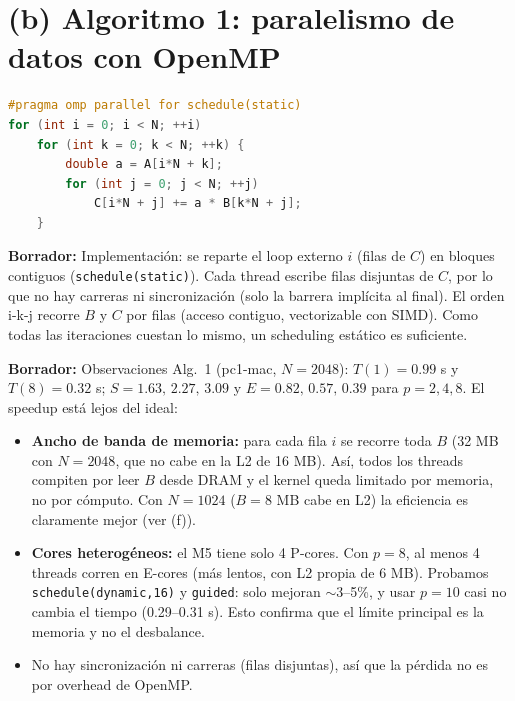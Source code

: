 \documentclass[11pt,a4paper]{article}
\newcommand{\pcA}{pc1-mac}
\newcommand{\nota}[1]{\par\noindent\colorbox{yellow!25}{\parbox{\dimexpr\linewidth-2\fboxsep}{\small\textbf{Borrador:} #1}}\par}
\begin{document}
\section{(b) Algoritmo 1: paralelismo de datos con OpenMP}
\begin{lstlisting}[language=C++]
#pragma omp parallel for schedule(static)
for (int i = 0; i < N; ++i)
    for (int k = 0; k < N; ++k) {
        double a = A[i*N + k];
        for (int j = 0; j < N; ++j)
            C[i*N + j] += a * B[k*N + j];
    }
\end{lstlisting}
\nota{Implementación: se reparte el loop externo $i$ (filas de $C$) en bloques contiguos (\texttt{schedule(static)}). Cada thread escribe filas disjuntas de $C$, por lo que no hay carreras ni sincronización (solo la barrera implícita al final). El orden i-k-j recorre $B$ y $C$ por filas (acceso contiguo, vectorizable con SIMD). Como todas las iteraciones cuestan lo mismo, un scheduling estático es suficiente.}

\nota{Observaciones Alg.~1 (\pcA, $N=2048$): $T(1)=0.99$ s y $T(8)=0.32$ s; $S=1.63,\,2.27,\,3.09$ y $E=0.82,\,0.57,\,0.39$ para $p=2,4,8$. El speedup está lejos del ideal:
\begin{itemize}
\item \textbf{Ancho de banda de memoria:} para cada fila $i$ se recorre toda $B$ (32 MB con $N=2048$, que no cabe en la L2 de 16 MB). Así, todos los threads compiten por leer $B$ desde DRAM y el kernel queda limitado por memoria, no por cómputo. Con $N=1024$ ($B=8$ MB cabe en L2) la eficiencia es claramente mejor (ver (f)).
\item \textbf{Cores heterogéneos:} el M5 tiene solo 4 P-cores. Con $p=8$, al menos 4 threads corren en E-cores (más lentos, con L2 propia de 6 MB). Probamos \texttt{schedule(dynamic,16)} y \texttt{guided}: solo mejoran $\sim$3--5\%, y usar $p=10$ casi no cambia el tiempo (0.29--0.31 s). Esto confirma que el límite principal es la memoria y no el desbalance.
\item No hay sincronización ni carreras (filas disjuntas), así que la pérdida no es por overhead de OpenMP.
\end{itemize}}

\end{document}
